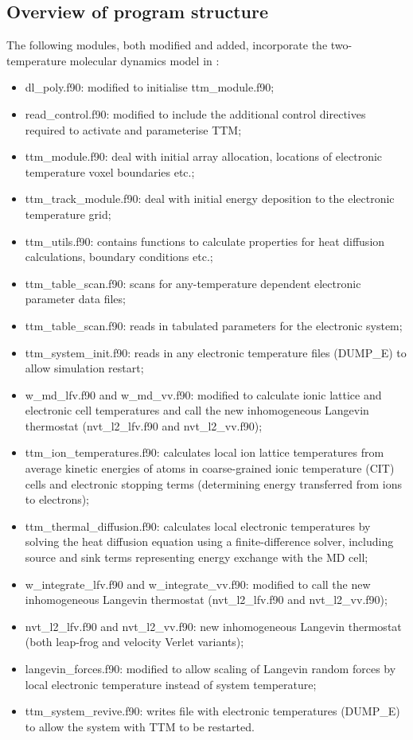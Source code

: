 \subsection*{Overview of program structure}

The following modules, both modified and added, incorporate the 
two-temperature molecular dynamics model in \D:
\begin{itemize}
	\item  {\sc dl\_poly.f90}: modified to initialise {\sc ttm\_module.f90};
	\item  {\sc read\_control.f90}: modified to include the additional control directives required to activate and parameterise TTM;
	\item  {\sc ttm\_module.f90}: deal with initial array allocation, locations of electronic temperature voxel boundaries etc.;
	\item  {\sc ttm\_track\_module.f90}: deal with initial energy deposition to the electronic temperature grid;
	\item  {\sc ttm\_utils.f90}: contains functions to calculate properties for heat diffusion calculations, boundary conditions etc.;
	\item  {\sc ttm\_table\_scan.f90}: scans for any-temperature dependent electronic parameter data files;
	\item  {\sc ttm\_table\_scan.f90}: reads in tabulated parameters for the electronic system;
	\item  {\sc ttm\_system\_init.f90}: reads in any electronic temperature files (DUMP\_E) to allow simulation restart;
	\item  {\sc w\_md\_lfv.f90} and {\sc w\_md\_vv.f90}: modified to calculate ionic lattice and electronic cell temperatures and call the new inhomogeneous Langevin thermostat ({\sc nvt\_l2\_lfv.f90} and {\sc nvt\_l2\_vv.f90});
	\item  {\sc ttm\_ion\_temperatures.f90}: calculates local ion lattice temperatures from average kinetic energies of atoms in coarse-grained ionic temperature (CIT) cells and electronic stopping terms (determining energy transferred from ions to electrons);
	\item  {\sc ttm\_thermal\_diffusion.f90}: calculates local electronic temperatures by solving the heat diffusion equation using a finite-difference solver, including source and sink terms representing energy exchange with the MD cell;
	\item  {\sc w\_integrate\_lfv.f90} and {\sc w\_integrate\_vv.f90}: modified to call the new inhomogeneous Langevin thermostat ({\sc nvt\_l2\_lfv.f90} and {\sc nvt\_l2\_vv.f90});
	\item  {\sc nvt\_l2\_lfv.f90} and {\sc nvt\_l2\_vv.f90}: new inhomogeneous Langevin thermostat (both leap-frog and velocity Verlet variants);
	\item {\sc langevin\_forces.f90}: modified to allow scaling of Langevin random forces by local electronic temperature instead of system temperature;
    \item  {\sc ttm\_system\_revive.f90}: writes file with electronic temperatures (DUMP\_E) to allow the system with TTM to be restarted. 
\end{itemize}
